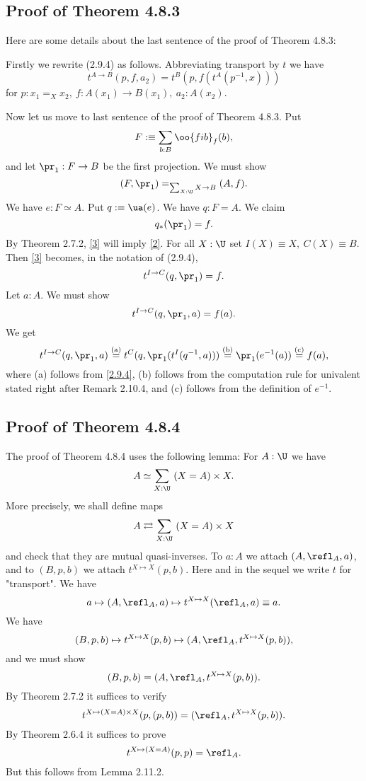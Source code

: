 \documentclass[12pt]{article}
\begin{document}

\subsection{Proof of Theorem 4.8.3}

Here are some details about the last sentence of the proof of Theorem 4.8.3:

Firstly we rewrite (2.9.4) as follows. Abbreviating transport by $t$ we have 
\begin{equation}\label{2.9.4}
t^{A\to B}(p,f,a_2)=t^B(p,f(t^A(p^{-1},x)))
\end{equation}
for $p:x_1=_Xx_2,\ f:A(x_1)\to B(x_1),\ a_2:A(x_2)$. 

Now let us move to last sentence of the proof of Theorem 4.8.3. Put
$$
F:\equiv\sum_{b:B}\oo{fib}_f(b),
$$ 
and let $\pr_1:F\to B$ be the first projection. We must show 
\begin{equation}\label{2}
(F,\pr_1)=_{\sum_{X:\U}X\to B}(A,f).
\end{equation} 
We have $e:F\simeq A$. Put $q:\equiv\ua(e)$. We have $q:F=A$. We claim 
\begin{equation}\label{3}
q_*(\pr_1)=f.
\end{equation} 
By Theorem 2.7.2, \eqref{3} will imply \eqref{2}. For all $X:\U$ set $I(X)\equiv X,\ C(X)\equiv B$. Then \eqref{3} becomes, in the notation of (2.9.4), 
$$
t^{I\to C}(q,\pr_1)=f.
$$ 
Let $a:A$. We must show 
$$
t^{I\to C}(q,\pr_1,a)=f(a).
$$ 
We get 
$$
t^{I\to C}(q,\pr_1,a)\overset{\text{(a)}}=t^C(q,\pr_1(t^I(q^{-1},a)))\overset{\text{(b)}}=\pr_1(e^{-1}(a))\overset{\text{(c)}}=f(a),
$$ 
where (a) follows from \eqref{2.9.4}, (b) follows from the computation rule for univalent stated right after Remark 2.10.4, and (c) follows from the definition of $e^{-1}$.


\subsection{Proof of Theorem 4.8.4}

The proof of Theorem 4.8.4 uses the following lemma: For $A:\U$ we have 
$$
A\simeq\sum_{X:\U}\ (X=A)\times X.
$$
More precisely, we shall define maps 
$$
A\rightleftarrows\sum_{X:\U}\ (X=A)\times X
$$ 
and check that they are mutual quasi-inverses. To $a:A$ we attach $(A,\refl_A,a)$, and to $(B,p,b)$ we attach $t^{X\mapsto X}(p,b)$. Here and in the sequel we write $t$ for "transport". We have 
$$
a\mapsto(A,\refl_A,a)\mapsto t^{X\mapsto X}(\refl_A,a)\equiv a.
$$ 
We have 
$$
(B,p,b)\mapsto t^{X\mapsto X}(p,b)\mapsto(A,\refl_A,t^{X\mapsto X}(p,b)),
$$ 
and we must show 
$$
(B,p,b)=(A,\refl_A,t^{X\mapsto X}(p,b)).
$$ 
By Theorem 2.7.2 it suffices to verify 
$$
t^{X\mapsto (X=A)\times X}(p,(p,b))=(\refl_A,t^{X\mapsto X}(p,b)).
$$ 
By Theorem 2.6.4 it suffices to prove 
$$
t^{X\mapsto (X=A)}(p,p)=\refl_A.
$$ 
But this follows from Lemma 2.11.2. 
\end{document}
